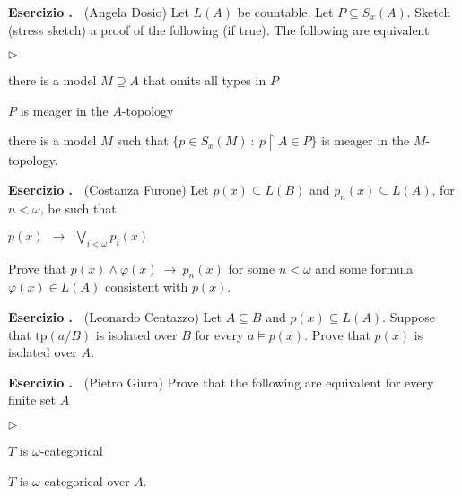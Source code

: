 \documentclass[10pt]{article}
\def\phi{\varphi}
\def\imp{\rightarrow}
\def\Aut{\textrm{Aut}}
\def\tp{\textrm{tp}}
\newcommand{\labella}[1]{{\sf\footnotesize #1}\hfill}
\renewenvironment{itemize}
  {\begin{list}{$\triangleright$}{%
   \setlength{\parskip}{0mm}
   \setlength{\topsep}{0mm}
   \setlength{\rightmargin}{0mm}
   \setlength{\listparindent}{0mm}
   \setlength{\itemindent}{0mm}
   \setlength{\labelwidth}{3ex}
   \setlength{\itemsep}{0mm}
   \setlength{\parsep}{0mm}
   \setlength{\partopsep}{0mm}
   \setlength{\labelsep}{1ex}
   \setlength{\leftmargin}{\labelwidth+\labelsep}
   \let\makelabel\labella}}{%
   \vspace*{-.3\baselineskip}
  \end{list}}
\newcounter{ex}
\newenvironment{exercise}{\bigskip\addtocounter{ex}{1}\textbf{Esercizio \theex.\ }}{}
\begin{document}
\begin{exercise}
  (Angela Dosio)
  Let $L(A)$ be countable.
  Let $P\subseteq S_x(A)$.
  Sketch (stress sketch) a proof of the following (if true).
  The following are equivalent
  \begin{itemize}
    \item [1.] there is a model $M\supseteq A$ that omits all types in $P$
    \item [2.] $P$ is meager in the $A$-topology
    \item [3.] there is a model $M$ such that $\big\{p\in S_x(M)\ :\ p{\restriction} A\in P\big\}$ is meager in the $M$-topology.
  \end{itemize} 
\end{exercise}

\begin{exercise}
  (Costanza Furone)
  Let $p(x)\subseteq L(B)$ and $p_n(x)\subseteq L(A)$, for $n<\omega$, be such that

  \hfil $p(x)\ \ \imp\ \ \displaystyle\bigvee_{i<\omega}p_i(x)$

  Prove that $p(x)\wedge\phi(x)\ \imp\ p_n(x)$
  for some $n<\omega$ and some formula $\phi(x)\in L(A)$ consistent with $p(x)$.
\end{exercise}

\begin{exercise} 
  (Leonardo Centazzo)
  Let $A\subseteq B$ and $p(x)\subseteq L(A)$. 
  Suppose that $\tp(a/B)$ is isolated over $B$ for every $a\models p(x)$.
  Prove that $p(x)$ is isolated over $A$.
\end{exercise}


\begin{exercise}
  (Pietro Giura)
  Prove that the following are equivalent for every finite set $A$
  \begin{itemize}   
  \item[1.] $T$ is $\omega$-categorical
  \item[2.] $T$ is $\omega$-categorical over $A$.
  \end{itemize}
\end{exercise}
\end{document}
